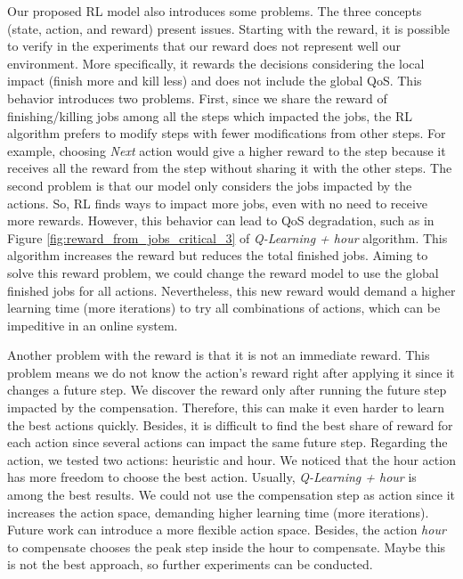 Our proposed RL model also introduces some problems. The three concepts (state, action, and reward) present issues. Starting with the reward, it is possible to verify in the experiments that our reward does not represent well our environment. More specifically, it rewards the decisions considering the local impact (finish more and kill less) and does not include the global QoS. This behavior introduces two problems. First, since we share the reward of finishing/killing jobs among all the steps which impacted the jobs, the RL algorithm prefers to modify steps with fewer modifications from other steps. For example, choosing \emph{Next} action would give a higher reward to the step because it receives all the reward from the step without sharing it with the other steps. The second problem is that our model only considers the jobs impacted by the actions. So, RL finds ways to impact more jobs, even with no need to receive more rewards. However, this behavior can lead to QoS degradation, such as in Figure \ref{fig:reward_from_jobs_critical_3} of \emph{Q-Learning + hour} algorithm. This algorithm increases the reward but reduces the total finished jobs. Aiming to solve this reward problem, we could change the reward model to use the global finished jobs for all actions. Nevertheless, this new reward would demand a higher learning time (more iterations) to try all combinations of actions, which can be impeditive in an online system. 

Another problem with the reward is that it is not an immediate reward. This problem means we do not know the action's reward right after applying it since it changes a future step. We discover the reward only after running the future step impacted by the compensation. Therefore, this can make it even harder to learn the best actions quickly. Besides, it is difficult to find the best share of reward for each action since several actions can impact the same future step. Regarding the action, we tested two actions: heuristic and hour. We noticed that the hour action has more freedom to choose the best action. Usually, \emph{Q-Learning + hour} is among the best results. We could not use the compensation step as action since it increases the action space, demanding higher learning time (more iterations). Future work can introduce a more flexible action space. Besides, the action \textit{hour} to compensate chooses the peak step inside the hour to compensate. Maybe this is not the best approach, so further experiments can be conducted.

